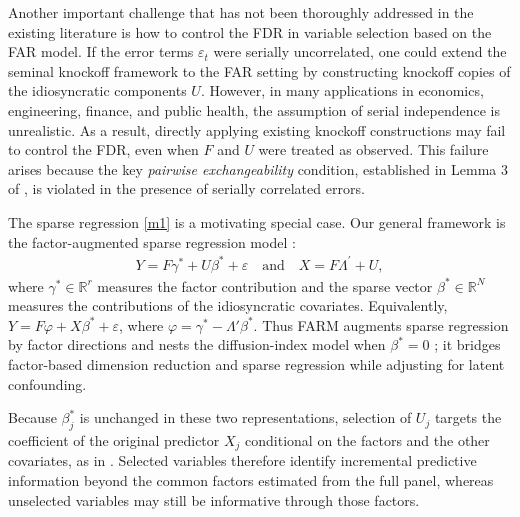 ﻿\documentclass[12pt]{article}
\newcommand{\0}{\mbox{\bf 0}}
\theoremstyle{plain}%
\theoremstyle{definition}
\begin{document}
Another important challenge that has not been thoroughly addressed in the existing literature is how to control the FDR in variable selection based on the FAR model. If the error terms $\varepsilon_t$ were serially uncorrelated, one could extend the seminal knockoff framework \citep[e.g.][]{BarberCandes2015, CandesFanEtal2018, LiuSunKe2024} to the FAR setting by constructing knockoff copies of the idiosyncratic components $U$. However, in many applications in economics, engineering, finance, and public health, the assumption of serial independence is unrealistic. As a result, directly applying existing knockoff constructions may fail to control the FDR, even when $F$ and $U$ were treated as observed. This failure arises because the key \textit{pairwise exchangeability} condition, established in Lemma 3 of \citet{BarberCandes2015}, is violated in the presence of serially {correlated} errors.

The sparse regression \eqref{m1} is a motivating special case. Our general framework is the factor-augmented sparse regression model \citep[][FARM]{FanLouYu2024}:
\begin{equation}
\begin{aligned} \label{eq:FARM}
Y  = F \gamma^* + U \beta^* + \varepsilon \quad \text{and} \quad
X  = F \Lambda^{\prime} + U,
\end{aligned}
\end{equation}
where $\gamma^* \in \mathbb{R}^r$ measures the factor contribution and the sparse vector $\beta^*\in \mathbb{R}^N$ measures the contributions of the idiosyncratic covariates. Equivalently, $Y=F\varphi+X\beta^*+\varepsilon$, where $\varphi=\gamma^*-\Lambda'\beta^*$. Thus FARM augments sparse regression by factor directions and nests the diffusion-index model when $\beta^*=0$ \citep{StockWatson2002,BaiNg2006}; it bridges factor-based dimension reduction and sparse regression while adjusting for latent confounding.

Because $\beta_j^*$ is unchanged in these two representations, selection of
$U_j$ targets the coefficient of the original predictor $X_j$ conditional on
the factors and the other covariates, as in \citet{FanKeWang2020}.
Selected variables therefore identify incremental predictive information
beyond the common factors estimated from the full panel, whereas unselected
variables may still be informative through those factors.
\end{document}
